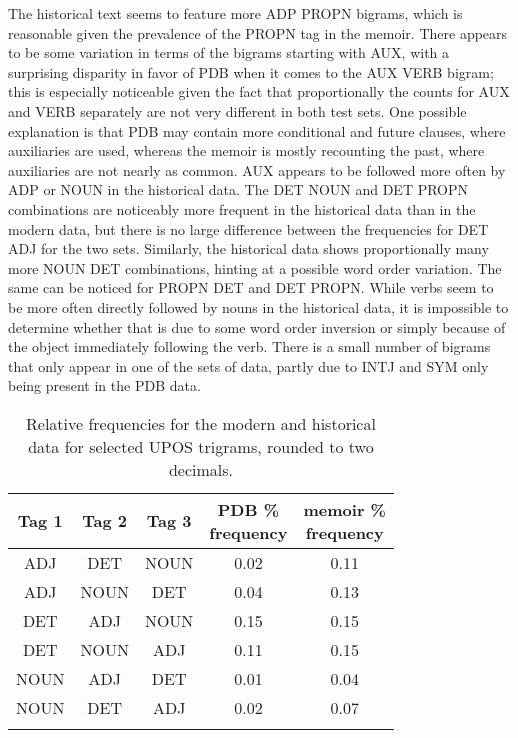 The historical text seems to feature more ADP PROPN bigrams, which is reasonable given the prevalence of the PROPN tag in the memoir. There appears to be some variation in terms of the bigrams starting with AUX, with a surprising disparity in favor of PDB when it comes to the AUX VERB bigram; this is especially noticeable given the fact that proportionally the counts for AUX and VERB separately are not very different in both test sets. One possible explanation is that PDB may contain more conditional and future clauses, where auxiliaries are used, whereas the memoir is mostly recounting the past, where auxiliaries are not nearly as common. AUX appears to be followed more often by ADP or NOUN in the historical data. The DET NOUN and DET PROPN combinations are noticeably more frequent in the historical data than in the modern data, but there is no large difference between the frequencies for DET ADJ for the two sets. Similarly, the historical data shows proportionally many more NOUN DET combinations, hinting at a possible word order variation. The same can be noticed for PROPN DET and DET PROPN. While verbs seem to be more often directly followed by nouns in the historical data, it is impossible to determine whether that is due to some word order inversion or simply because of the object immediately following the verb. There is a small number of bigrams that only appear in one of the sets of data, partly due to INTJ and SYM only being present in the PDB data.

\renewcommand{\arraystretch}{1}
\begin{longtable}[H]{|ccc|c|c|}
\hline \bf Tag 1 & \bf Tag 2 & \bf Tag 3 & \bf \makecell[c]{PDB \% \\ frequency} & \bf \makecell[c]{memoir \% \\ frequency} \\ \hline
ADJ & DET & NOUN & 0.02 & 0.11 \\
ADJ & NOUN & DET & 0.04 & 0.13 \\ \hline
DET & ADJ & NOUN & 0.15 & 0.15 \\
DET & NOUN & ADJ & 0.11 & 0.15 \\ \hline
NOUN & ADJ & DET & 0.01 & 0.04 \\
NOUN & DET & ADJ & 0.02 & 0.07 \\
\hline
\caption{\label{table:selected-trigrams} Relative frequencies for the modern and historical data for selected UPOS trigrams, rounded to two decimals.}
\end{longtable}

